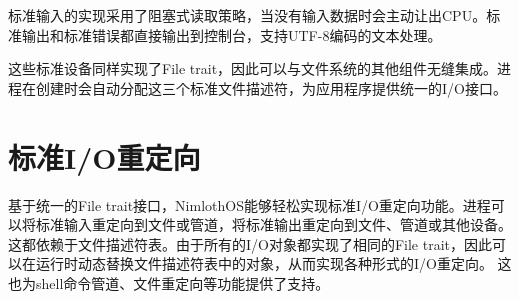 标准输入的实现采用了阻塞式读取策略，当没有输入数据时会主动让出CPU。标准输出和标准错误都直接输出到控制台，支持UTF-8编码的文本处理。

这些标准设备同样实现了File trait，因此可以与文件系统的其他组件无缝集成。进程在创建时会自动分配这三个标准文件描述符，为应用程序提供统一的I/O接口。

\section{标准I/O重定向}

基于统一的File trait接口，NimlothOS能够轻松实现标准I/O重定向功能。进程可以将标准输入重定向到文件或管道，将标准输出重定向到文件、管道或其他设备。
这都依赖于文件描述符表。由于所有的I/O对象都实现了相同的File trait，因此可以在运行时动态替换文件描述符表中的对象，从而实现各种形式的I/O重定向。
这也为shell命令管道、文件重定向等功能提供了支持。
